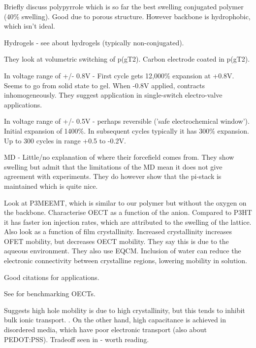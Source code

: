 \documentclass{article}
\begin{document}
Briefly discuss polypyrrole which is so far the best swelling conjugated polymer \cite{carpi2009biomedical} (40\% swelling). Good due to porous structure. However backbone is hydrophobic, which isn't ideal.   

Hydrogels - see \cite[Ionov, 2014]{Ionov2014} about hydrogels (typically non-conjugated). 

They look at volumetric switching of p(gT2).  Carbon electrode coated in p(gT2).  

In voltage range of +/- 0.8V - First cycle gets 12,000\% expansion at +0.8V.   Seems to go from solid state to gel.   When -0.8V applied, contracts inhomogeneously.  They suggest application in single-switch electro-valve applications. 

In voltage range of +/- 0.5V - perhaps reversible ('safe electrochemical window').  Initial expansion of 1400\%.  In subsequent cycles typically it has 300\% expansion. Up to 300 cycles in range +0.5 to -0.2V. 

MD - Little/no explanation of where their forcefield comes from.  They show swelling but admit that the limitations of the MD mean it does not give agreement with experiments.  They do however show that the pi-stack is maintained which is quite nice.  

 


 \vspace{1cm}
{\bf \cite{Flagg2019}}

Look at P3MEEMT, which is similar to our polymer but without the oxygen on the backbone.  Characterise OECT as a function of the anion. Compared to P3HT it has faster ion injection rates, which are attributed to the swelling of the lattice. Also look as a function of film crystallinity. Increased crystallinity increases OFET mobility, but decreases OECT mobility.  They say this is due to the aqueous environment.  They also use EQCM.   Inclusion of water can reduce the electronic connectivity between crystalline regions, lowering mobility in solution.  

Good citations for applications.  

See \cite{Inal2017} for benchmarking OECTs.  

Suggests high hole mobility is due to high crystallinity, but this tends to inhibit bulk ionic transport. \cite{Tseng2014}.  On the other hand, high capacitance is achieved in disordered media, which have poor electronic transport \cite{Rivnay2016} (also about PEDOT:PSS).  Tradeoff seen in \cite{Giridharagopal2017} - worth reading. 
\end{document}
